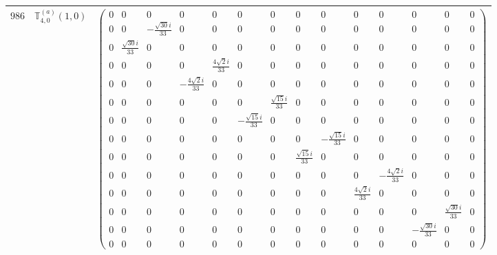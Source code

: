 \documentclass[fleqn,8pt,landscape]{jsarticle}
\begin{document}
\begin{center}
\begin{longtable}{ccc}
$ 986 $ & $ \mathbb{T}_{4,0}^{(a)}(1,0) $ & $ \begin{pmatrix} 0 & 0 & 0 & 0 & 0 & 0 & 0 & 0 & 0 & 0 & 0 & 0 & 0 & 0 \\ 0 & 0 & - \frac{\sqrt{30} i}{33} & 0 & 0 & 0 & 0 & 0 & 0 & 0 & 0 & 0 & 0 & 0 \\ 0 & \frac{\sqrt{30} i}{33} & 0 & 0 & 0 & 0 & 0 & 0 & 0 & 0 & 0 & 0 & 0 & 0 \\ 0 & 0 & 0 & 0 & \frac{4 \sqrt{2} i}{33} & 0 & 0 & 0 & 0 & 0 & 0 & 0 & 0 & 0 \\ 0 & 0 & 0 & - \frac{4 \sqrt{2} i}{33} & 0 & 0 & 0 & 0 & 0 & 0 & 0 & 0 & 0 & 0 \\ 0 & 0 & 0 & 0 & 0 & 0 & \frac{\sqrt{15} i}{33} & 0 & 0 & 0 & 0 & 0 & 0 & 0 \\ 0 & 0 & 0 & 0 & 0 & - \frac{\sqrt{15} i}{33} & 0 & 0 & 0 & 0 & 0 & 0 & 0 & 0 \\ 0 & 0 & 0 & 0 & 0 & 0 & 0 & 0 & - \frac{\sqrt{15} i}{33} & 0 & 0 & 0 & 0 & 0 \\ 0 & 0 & 0 & 0 & 0 & 0 & 0 & \frac{\sqrt{15} i}{33} & 0 & 0 & 0 & 0 & 0 & 0 \\ 0 & 0 & 0 & 0 & 0 & 0 & 0 & 0 & 0 & 0 & - \frac{4 \sqrt{2} i}{33} & 0 & 0 & 0 \\ 0 & 0 & 0 & 0 & 0 & 0 & 0 & 0 & 0 & \frac{4 \sqrt{2} i}{33} & 0 & 0 & 0 & 0 \\ 0 & 0 & 0 & 0 & 0 & 0 & 0 & 0 & 0 & 0 & 0 & 0 & \frac{\sqrt{30} i}{33} & 0 \\ 0 & 0 & 0 & 0 & 0 & 0 & 0 & 0 & 0 & 0 & 0 & - \frac{\sqrt{30} i}{33} & 0 & 0 \\ 0 & 0 & 0 & 0 & 0 & 0 & 0 & 0 & 0 & 0 & 0 & 0 & 0 & 0 \end{pmatrix} $ \\ \hline

\end{longtable}
\end{center}
\end{document}
